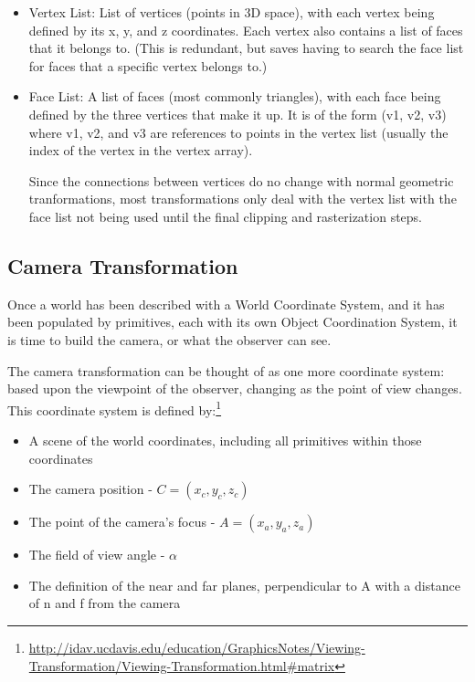 \documentclass{article}
\begin{document}
\begin{itemize}
\item{Vertex List:
List of vertices (points in 3D space), with each vertex being defined by its x, y, and z coordinates. Each vertex also contains a list of faces that it belongs to. (This is redundant, but saves having to search the face list for faces that a specific vertex belongs to.)}

\item{Face List:
A list of faces (most commonly triangles), with each face being defined by the three vertices that make it up. It is of the form (v1, v2, v3) where v1, v2, and v3 are references to points in the vertex list (usually the index of the vertex in the vertex array).

Since the connections between vertices do no change with normal geometric tranformations, most transformations only deal with the vertex list with the face list not being used until the final clipping and rasterization steps.}
\end{itemize}

\subsection{Camera Transformation}
Once a world has been described with a World Coordinate System, and it has been populated by primitives, each with its own Object Coordination System, it is time to build the camera, or what the observer can see.

The camera transformation can be thought of as one more coordinate system: based upon the viewpoint of the observer, changing as the point of view changes. This coordinate system is defined  by:\footnote{\url{http://idav.ucdavis.edu/education/GraphicsNotes/Viewing-Transformation/Viewing-Transformation.html\#matrix}}

\begin{itemize}
\item A scene of the world coordinates, including all primitives within those coordinates
\item The camera position - $C = (x_{c}, y_{c}, z_{c})$
\item The point of the camera's focus - $A = (x_{a}, y_{a}, z_{a})$
\item The field of view angle - $\alpha$
\item The definition of the near and far planes, perpendicular to A with a distance of n and f from the camera
\end{itemize}
\end{document}
